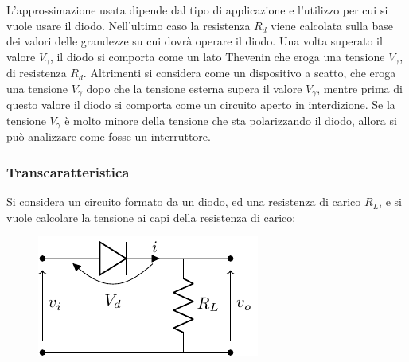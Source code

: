 \documentclass{article}
\numberwithin{equation}{subsection}
\begin{document}
L'approssimazione usata dipende dal tipo di applicazione e l'utilizzo per cui si vuole usare il diodo. Nell'ultimo caso 
la resistenza $R_d$ viene calcolata sulla base dei valori delle grandezze su cui dovrà operare il diodo. Una volta superato il valore $V_{\gamma}$, il diodo si comporta come 
un lato Thevenin che eroga una tensione $V_{\gamma}$, di resistenza $R_d$. 
Altrimenti si considera come un dispositivo a scatto, che eroga una tensione $V_{\gamma}$ dopo che la tensione esterna supera il valore $V_{\gamma}$, mentre prima di questo 
valore il diodo si comporta come un circuito aperto in interdizione. 
Se la tensione $V_{\gamma}$ è molto minore della tensione che sta polarizzando il diodo, allora si può analizzare come fosse un interruttore. 

\subsubsection{Transcaratteristica}

Si considera un circuito formato da un diodo, ed una resistenza di carico $R_L$, e si vuole calcolare la tensione ai capi della resistenza di carico:
\begin{figure}[H]%
    \centering
    \includegraphics{transcaratteristica-diodo-circuito.pdf}%
    \label{fig:tanscaratteristica-diodo-circuito}
\end{figure}
\end{document}
